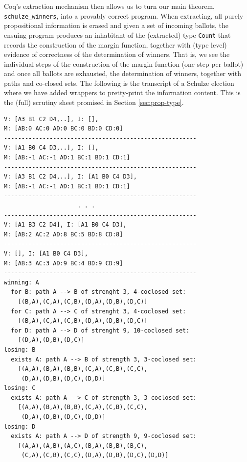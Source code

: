 Coq's extraction mechanism then allows us to turn our main theorem, 
\texttt{schulze\_winners}, into a
provably correct program. When extracting, all purely propositional
information is erased and given a set of incoming ballots, the ensuing program produces an inhabitant
of the (extracted) type \texttt{Count} that records the construction
of the margin function, together with (type level) evidence of
correctness of the determination of winners. That is, we see the
individual steps of the construction of the margin function (one
step per
ballot) and once all ballots are exhausted, the determination of
winners, together with paths and co-closed sets. The following is
the transcript of a Schulze election where we have added wrappers
to pretty-print the information content. This is the (full) scrutiny
sheet promised in Section \ref{sec:prop-type}.
%
\begin{verbatim}
V: [A3 B1 C2 D4,..], I: [],
M: [AB:0 AC:0 AD:0 BC:0 BD:0 CD:0]
-------------------------------------------------------
V: [A1 B0 C4 D3,..], I: [],
M: [AB:-1 AC:-1 AD:1 BC:1 BD:1 CD:1]
-------------------------------------------------------
V: [A3 B1 C2 D4,..], I: [A1 B0 C4 D3],
M: [AB:-1 AC:-1 AD:1 BC:1 BD:1 CD:1]
-------------------------------------------------------
                     . . .
-------------------------------------------------------
V: [A1 B3 C2 D4], I: [A1 B0 C4 D3],
M: [AB:2 AC:2 AD:8 BC:5 BD:8 CD:8]
-------------------------------------------------------
V: [], I: [A1 B0 C4 D3],
M: [AB:3 AC:3 AD:9 BC:4 BD:9 CD:9]
-------------------------------------------------------
winning: A
  for B: path A --> B of strenght 3, 4-coclosed set: 
    [(B,A),(C,A),(C,B),(D,A),(D,B),(D,C)]
  for C: path A --> C of strenght 3, 4-coclosed set:
    [(B,A),(C,A),(C,B),(D,A),(D,B),(D,C)]
  for D: path A --> D of strenght 9, 10-coclosed set:
    [(D,A),(D,B),(D,C)]
losing: B
  exists A: path A --> B of strength 3, 3-coclosed set:
    [(A,A),(B,A),(B,B),(C,A),(C,B),(C,C),
     (D,A),(D,B),(D,C),(D,D)]
losing: C
  exists A: path A --> C of strength 3, 3-coclosed set:
    [(A,A),(B,A),(B,B),(C,A),(C,B),(C,C),
     (D,A),(D,B),(D,C),(D,D)]
losing: D
  exists A: path A --> D of strength 9, 9-coclosed set:
    [(A,A),(A,B),(A,C),(B,A),(B,B),(B,C),
     (C,A),(C,B),(C,C),(D,A),(D,B),(D,C),(D,D)]  
\end{verbatim}

